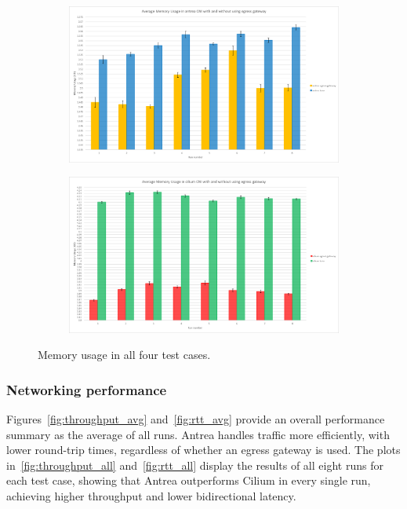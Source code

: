 \begin{figure}[H]
    \begin{subfigure}[b]{0.45\textwidth}
        \includegraphics[width=\textwidth]{plots/egress/memory_antrea.png}
        \caption{}
        \label{fig:memory_c}
    \end{subfigure}
    \hfill
    \begin{subfigure}[b]{0.45\textwidth}
        \includegraphics[width=\textwidth]{plots/egress/memory_cilium.png}
        \caption{}
        \label{fig:memory_d}
    \end{subfigure}
    
    \caption{Memory usage in all four test cases.}
    \label{fig:memoryFour}
\end{figure}



\subsubsection{Networking performance}
\label{sec:egressNetworkingPerformance}

Figures~\ref{fig:throughput_avg} and~\ref{fig:rtt_avg} provide an overall performance summary as the average of all runs. Antrea handles traffic more efficiently, with lower round-trip times, regardless of whether an egress gateway is used. The plots in~\ref{fig:throughput_all} and~\ref{fig:rtt_all} display the results of all eight runs for each test case, showing that Antrea outperforms Cilium in every single run, achieving higher throughput and lower bidirectional latency.


